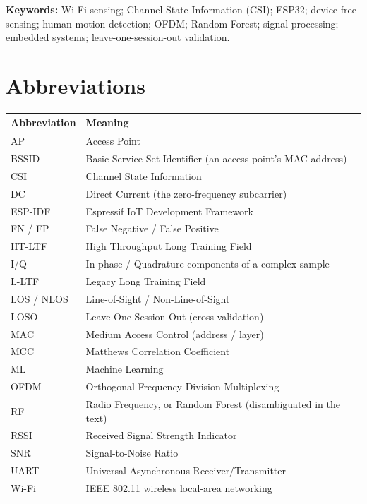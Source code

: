 \documentclass[11pt,a4paper,oneside]{report}
\begin{document}
\medskip
\noindent
\textbf{Keywords:} Wi-Fi sensing; Channel State Information (CSI); ESP32;
device-free sensing; human motion detection; OFDM; Random Forest; signal
processing; embedded systems; leave-one-session-out validation.

\tableofcontents
\listoffigures
\listoftables

\chapter*{Abbreviations}

\begin{center}
\begin{tabularx}{\linewidth}{@{}lX@{}}
\toprule
\textbf{Abbreviation} & \textbf{Meaning} \\
\midrule
AP        & Access Point \\
BSSID     & Basic Service Set Identifier (an access point's MAC address) \\
CSI       & Channel State Information \\
DC        & Direct Current (the zero-frequency subcarrier) \\
ESP-IDF   & Espressif IoT Development Framework \\
FN / FP   & False Negative / False Positive \\
HT-LTF    & High Throughput Long Training Field \\
I/Q       & In-phase / Quadrature components of a complex sample \\
L-LTF     & Legacy Long Training Field \\
LOS / NLOS& Line-of-Sight / Non-Line-of-Sight \\
LOSO      & Leave-One-Session-Out (cross-validation) \\
MAC       & Medium Access Control (address / layer) \\
MCC       & Matthews Correlation Coefficient \\
ML        & Machine Learning \\
OFDM      & Orthogonal Frequency-Division Multiplexing \\
RF        & Radio Frequency, or Random Forest (disambiguated in the text) \\
RSSI      & Received Signal Strength Indicator \\
SNR       & Signal-to-Noise Ratio \\
UART      & Universal Asynchronous Receiver/Transmitter \\
Wi-Fi     & IEEE 802.11 wireless local-area networking \\
\bottomrule
\end{tabularx}
\end{center}
\end{document}
